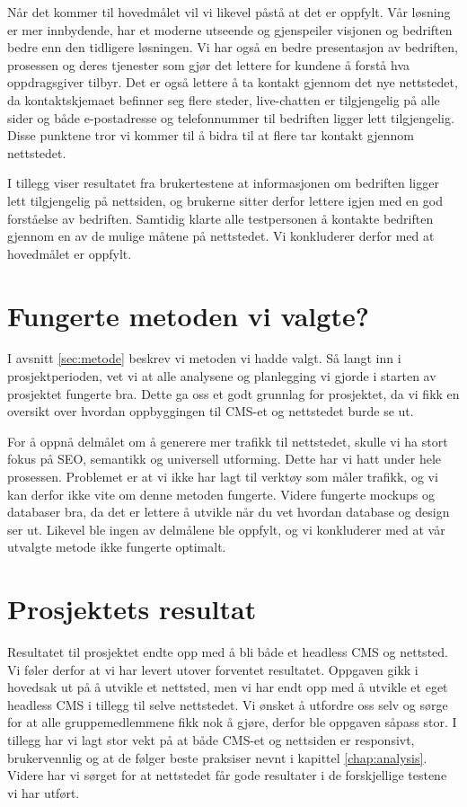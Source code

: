 Når det kommer til hovedmålet vil vi likevel påstå at det er oppfylt. Vår løsning er mer innbydende, har et moderne utseende og gjenspeiler visjonen og bedriften bedre enn den tidligere løsningen. Vi har også en bedre presentasjon av bedriften, prosessen og deres tjenester som gjør det lettere for kundene å forstå hva oppdragsgiver tilbyr. Det er også lettere å ta kontakt gjennom det nye nettstedet, da kontaktskjemaet befinner seg flere steder, live-chatten er tilgjengelig på alle sider og både e-postadresse og telefonnummer til bedriften ligger lett tilgjengelig. Disse punktene tror vi kommer til å bidra til at flere tar kontakt gjennom nettstedet. 

I tillegg viser resultatet fra brukertestene at informasjonen om bedriften ligger lett tilgjengelig på nettsiden, og brukerne sitter derfor lettere igjen med en god forståelse av bedriften. Samtidig klarte alle testpersonen å kontakte bedriften gjennom en av de mulige måtene på nettstedet. Vi konkluderer derfor med at hovedmålet er oppfylt. 


\section{Fungerte metoden vi valgte?}
I avsnitt \ref{sec:metode} beskrev vi metoden vi hadde valgt. Så langt inn i prosjektperioden, vet vi at alle analysene og planlegging vi gjorde i starten av prosjektet fungerte bra. Dette ga oss et godt grunnlag for prosjektet, da vi fikk en oversikt over hvordan oppbyggingen til CMS-et og nettstedet burde se ut. 

For å oppnå delmålet om å generere mer trafikk til nettstedet, skulle vi ha stort fokus på SEO, semantikk og universell utforming. Dette har vi hatt under hele prosessen. Problemet er at vi ikke har lagt til verktøy som måler trafikk, og vi kan derfor ikke vite om denne metoden fungerte. Videre fungerte mockups og databaser bra, da det er lettere å utvikle når du vet hvordan database og design ser ut. Likevel ble ingen av delmålene ble oppfylt, og vi konkluderer med at vår utvalgte metode ikke fungerte optimalt.

\section{Prosjektets resultat}
Resultatet til prosjektet endte opp med å bli både et headless CMS og nettsted. Vi føler derfor at vi har levert utover forventet resultatet. Oppgaven gikk i hovedsak ut på å utvikle et nettsted, men vi har endt opp med å utvikle et eget headless CMS i tillegg til selve nettstedet. Vi ønsket å utfordre oss selv og sørge for at alle gruppemedlemmene fikk nok å gjøre, derfor ble oppgaven såpass stor. I tillegg har vi lagt stor vekt på at både CMS-et og nettsiden er responsivt, brukervennlig og at de følger beste praksiser nevnt i kapittel \ref{chap:analysis}. Videre har vi sørget for at nettstedet får gode resultater i de forskjellige testene vi har utført.

